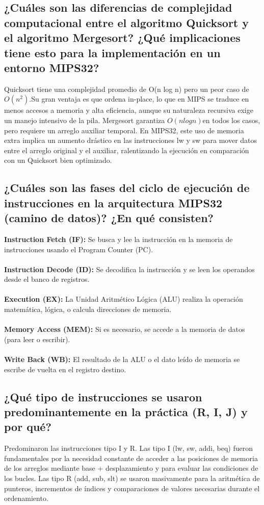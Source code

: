 \documentclass[12pt, a4paper]{article}
\begin{document}
\subsection{¿Cuáles son las diferencias de complejidad computacional entre el algoritmo Quicksort y el algoritmo Mergesort? ¿Qué implicaciones tiene esto para la implementación en un entorno MIPS32?}
    Quicksort tiene una complejidad promedio de O(n log n) pero un peor caso de $O(n^2)$$. $Su gran ventaja es que ordena in-place, lo que en MIPS se traduce en menos accesos a memoria y alta eficiencia, aunque su naturaleza recursiva exige un manejo intensivo de la pila. Mergesort garantiza $O(n log n)$$ $en todos los casos, pero requiere un arreglo auxiliar temporal. En MIPS32, este uso de memoria extra implica un aumento drástico en las instrucciones lw y sw para mover datos entre el arreglo original y el auxiliar, ralentizando la ejecución en comparación con un Quicksort bien optimizado.

\subsection{ ¿Cuáles son las fases del ciclo de ejecución de instrucciones en la arquitectura MIPS32 (camino de datos)? ¿En qué consisten?}
    \textbf{Instruction Fetch (IF):} Se busca y lee la instrucción en la memoria de instrucciones usando el Program Counter (PC).\\\\
    \textbf{Instruction Decode (ID):} Se decodifica la instrucción y se leen los operandos desde el banco de registros.\\\\
    \textbf{Execution (EX):} La Unidad Aritmético Lógica (ALU) realiza la operación matemática, lógica, o calcula direcciones de memoria.\\\\
    \textbf{Memory Access (MEM):} Si es necesario, se accede a la memoria de datos (para leer o escribir).\\\\
    \textbf{Write Back (WB):} El resultado de la ALU o el dato leído de memoria se escribe de vuelta en el registro destino.\\

\subsection{¿Qué tipo de instrucciones se usaron predominantemente en la práctica (R, I, J) y por qué?}
    Predominaron las instrucciones tipo I y R. Las tipo I (lw, sw, addi, beq) fueron fundamentales por la necesidad constante de acceder a las posiciones de memoria de los arreglos mediante base + desplazamiento y para evaluar las condiciones de los bucles. Las tipo R (add, sub, slt) se usaron masivamente para la aritmética de punteros, incrementos de índices y comparaciones de valores necesarias durante el ordenamiento.
\end{document}
